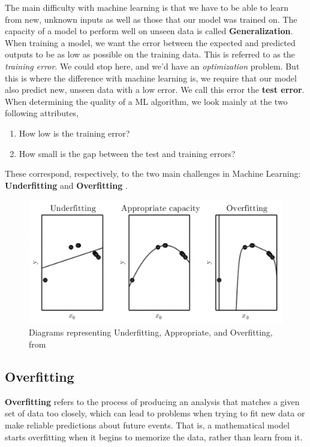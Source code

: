 \documentclass{article}
\begin{document}
 The main difficulty with machine learning is that we have to be able to learn from new, unknown inputs as well as those that our model was trained on. The capacity of a model to perform well on unseen data is called \textbf{Generalization}. When training a model, we want the error between the expected and predicted outputs to be as low as possible on the training data. This is referred to as the \textit{training error}. We could stop here, and we'd have an \textit{optimization} problem. But this is where the difference with machine learning is, we require that our model also predict new, unseen data with a low error. We call this error the \textbf{test error}. 
When determining the quality of a ML algorithm, we look mainly at the two following attributes,
\begin{enumerate}
  \item How low is the training error? 
  \item How small is the gap between the test and training errors?
\end{enumerate}
These correspond, respectively, to the two main challenges in Machine Learning: \textbf{Underfitting} and \textbf{Overfitting} \citep{Goodfellow-et-al-2016}.
\begin{figure}
\includegraphics{fitting}
  \caption{Diagrams representing Underfitting, Appropriate, and Overfitting, from \citep{Goodfellow-et-al-2016}}
\end{figure}
  \subsection{Overfitting}%
  \label{sub:Overfitting}
\textbf{Overfitting} refers to the process of producing an analysis that matches a given set of data too closely, which can lead to problems when trying to fit new data or make reliable predictions about future events. That is, a mathematical model starts overfitting when it begins to memorize the data, rather than learn from it. 
\end{document}
